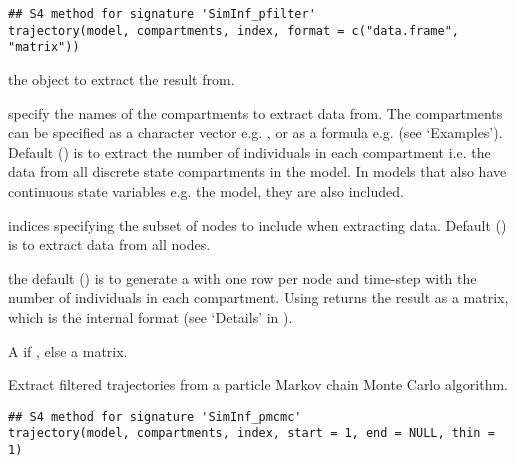\documentclass[letterpaper]{book}
\begin{document}
%
\begin{Usage}
\begin{verbatim}
## S4 method for signature 'SimInf_pfilter'
trajectory(model, compartments, index, format = c("data.frame", "matrix"))
\end{verbatim}
\end{Usage}
%
\begin{Arguments}
\begin{ldescription}
\item[\code{model}] the  object to extract the
result from.

\item[\code{compartments}] specify the names of the compartments to
extract data from. The compartments can be specified as a
character vector e.g. ,
or as a formula e.g.  (see
`Examples'). Default () is to
extract the number of individuals in each compartment i.e. the
data from all discrete state compartments in the model. In
models that also have continuous state variables e.g. the
 model, they are also included.

\item[\code{index}] indices specifying the subset of nodes to include
when extracting data. Default () is to
extract data from all nodes.

\item[\code{format}] the default () is to
generate a  with one row per node and
time-step with the number of individuals in each
compartment. Using  returns the result
as a matrix, which is the internal format (see
`Details' in
).
\end{ldescription}
\end{Arguments}
%
\begin{Value}
A  if , else
a matrix.
\end{Value}
%
\begin{Description}
Extract filtered trajectories from a particle Markov chain Monte
Carlo algorithm.
\end{Description}
%
\begin{Usage}
\begin{verbatim}
## S4 method for signature 'SimInf_pmcmc'
trajectory(model, compartments, index, start = 1, end = NULL, thin = 1)
\end{verbatim}
\end{Usage}
\end{document}
